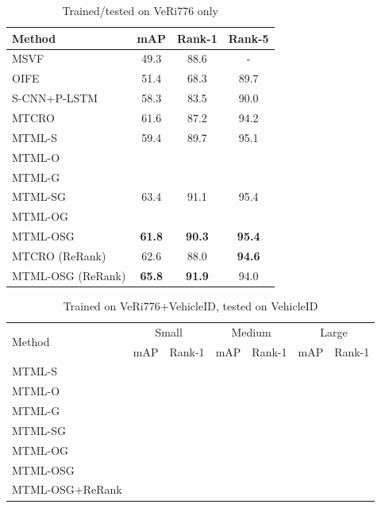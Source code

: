 \documentclass[10pt,twocolumn,letterpaper]{article}
\begin{document}
\begin{table}
  \centering
  \begin{tabular}{l || c | c | c }
    \hline
    Method & mAP & Rank-1 & Rank-5 \\
    \hline
    MSVF \cite{kanaci2018vehicle} & 49.3 & 88.6 & - \\
    OIFE \cite{wang2017orientation} & 51.4 & 68.3 & 89.7 \\
    S-CNN+P-LSTM \cite{Shen_2017_ICCV} & 58.3 & 83.5 & 90.0 \\
    MTCRO \cite{xu2018framework} & 61.6 & 87.2 & 94.2 \\
    \hline
    MTML-S & 59.4 & 89.7 & 95.1 \\
    MTML-O & \\
    MTML-G & \\
    MTML-SG & 63.4 & 91.1 & 95.4 \\
    MTML-OG & \\
    MTML-OSG & \bf{61.8} & \bf{90.3} & \bf{95.4} \\
    \hline
    MTCRO (ReRank) \cite{xu2018framework} & 62.6 & 88.0 & \bf{94.6} \\
    MTML-OSG (ReRank) & \bf{65.8} & \bf{91.9} & 94.0 \\
    \hline
  \end{tabular}
  \caption{Trained/tested on VeRi776 only}
  \label{T:benchmark_results_veri}
\end{table}

\begin{table}
  \centering
  \begin{tabular}{l || c | c || c | c || c | c }
    \hline
    \multirow{2}{*}{Method} & \multicolumn{2}{c}{Small} & \multicolumn{2}{c}{Medium} &\multicolumn{2}{c}{Large} \\
    \cline{2-7}
    & mAP & Rank-1 & mAP & Rank-1 & mAP & Rank-1 \\
    \hline
    MTML-S & \\
    MTML-O & \\
    MTML-G & \\
    MTML-SG & \\
    MTML-OG & \\
    MTML-OSG & \\
    MTML-OSG+ReRank & \\
    \hline
  \end{tabular}
  \caption{Trained on VeRi776+VehicleID, tested on VehicleID}
  \label{T:benchmark_results_vehicleid}
\end{table}
\end{document}
